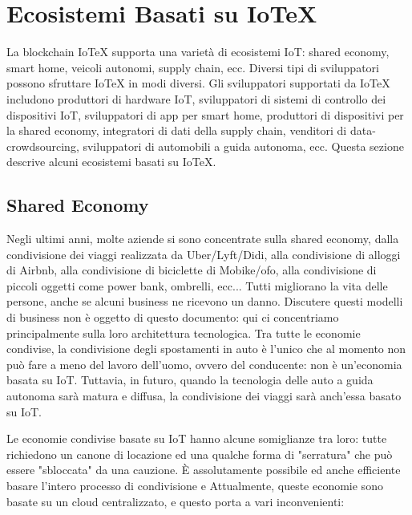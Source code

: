 \section{Ecosistemi Basati su IoTeX}

La blockchain IoTeX supporta una varietà di ecosistemi IoT: shared economy, smart home, veicoli autonomi, supply chain, ecc. Diversi tipi di sviluppatori possono sfruttare IoTeX in modi diversi. Gli sviluppatori supportati da IoTeX includono produttori di hardware IoT, sviluppatori di sistemi di controllo dei dispositivi IoT, sviluppatori di app per smart home, produttori di dispositivi per la shared economy, integratori di dati della supply chain, venditori di data-crowdsourcing, sviluppatori di automobili a guida autonoma, ecc. Questa sezione descrive alcuni ecosistemi basati su IoTeX.

\subsection{Shared Economy}
Negli ultimi anni, molte aziende si sono concentrate sulla shared economy, dalla condivisione dei viaggi realizzata da Uber/Lyft/Didi, alla condivisione di alloggi di Airbnb, alla condivisione di biciclette di Mobike/ofo, alla condivisione di piccoli oggetti come power bank, ombrelli, ecc... Tutti migliorano la vita delle persone, anche se alcuni business ne ricevono un danno. Discutere questi modelli di business non è oggetto di questo documento: qui ci concentriamo principalmente sulla loro architettura tecnologica. Tra tutte le economie condivise, la condivisione degli spostamenti in auto è l'unico che al momento non può fare a meno del lavoro dell'uomo, ovvero del conducente: non è un'economia basata su IoT. Tuttavia, in futuro, quando la tecnologia delle auto a guida autonoma sarà matura e diffusa, la condivisione dei viaggi sarà anch'essa basato su IoT.

Le economie condivise basate su IoT hanno alcune somiglianze tra loro: tutte richiedono un canone di locazione ed una qualche forma di "serratura" che può essere "sbloccata" da una cauzione. È assolutamente possibile ed anche efficiente basare l'intero processo di condivisione e Attualmente, queste economie sono basate su un cloud centralizzato, e questo porta a vari inconvenienti:

